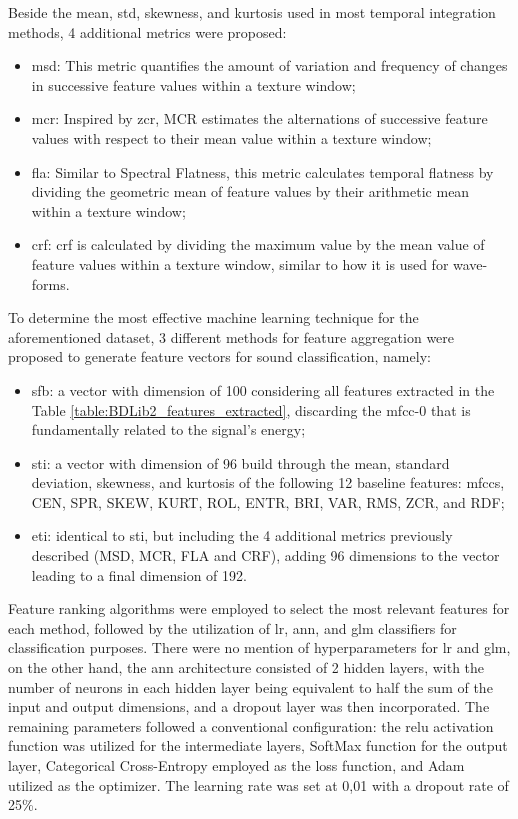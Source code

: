  Beside the mean, \gls{std}, skewness, and kurtosis used in most temporal integration methods, 4 additional metrics were proposed:

 \begin{itemize}
    \item \gls{msd}: This metric quantifies the amount of variation and frequency of changes in successive feature values within a texture window;
    \item \gls{mcr}: Inspired by \gls{zcr}, MCR estimates the alternations of successive feature values with respect to their mean value within a texture window;
    \item \gls{fla}: Similar to Spectral Flatness, this metric calculates temporal flatness by dividing the geometric mean of feature values by their arithmetic mean within a texture window;
    \item \gls{crf}:  \gls{crf} is calculated by dividing the maximum value by the mean value of feature values within a texture window, similar to how it is used for wave-forms.
\end{itemize}
	
To determine the most effective machine learning technique for the aforementioned dataset, 3 different methods for feature aggregation were proposed to generate feature vectors for sound classification, namely:

\begin{itemize}
    \item \gls{sfb}: a vector with dimension of 100 considering all features extracted in the Table \ref{table:BDLib2_features_extracted}, discarding the \gls{mfcc}-0 that is fundamentally related to the signal's energy;
    \item \gls{sti}: a vector with dimension of 96 build through the mean, standard deviation, skewness, and kurtosis of the following 12 baseline features: \gls{mfcc}s, CEN, SPR, SKEW, KURT, ROL, ENTR, BRI, VAR, RMS, ZCR, and RDF;
    \item \gls{eti}: identical to \gls{sti}, but including the 4 additional metrics previously described (MSD, MCR, FLA and CRF), adding 96 dimensions to the vector leading to a final dimension of 192.
\end{itemize}

Feature ranking algorithms were employed to select the most relevant features for each method, followed by the utilization of \gls{lr}, \gls{ann}, and \gls{glm} classifiers for classification purposes. There were no mention of hyperparameters for \gls{lr} and \gls{glm}, on the other hand, the \gls{ann} architecture consisted of 2 hidden layers, with the number of neurons in each hidden layer being equivalent to half the sum of the input and output dimensions, and a dropout layer was then incorporated. The remaining parameters followed a conventional configuration: the \gls{relu} activation function was utilized for the intermediate layers, SoftMax function for the output layer, Categorical Cross-Entropy employed as the loss function, and Adam utilized as the optimizer. The learning rate was set at 0,01 with a dropout rate of 25\%.

